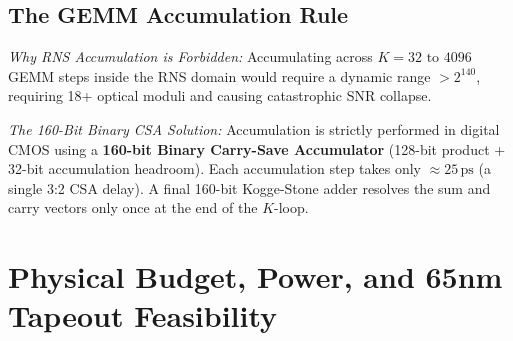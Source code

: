 \documentclass[10pt,journal,compsoc]{IEEEtran}
\begin{document}
\subsection{The GEMM Accumulation Rule}
\textit{Why RNS Accumulation is Forbidden:} Accumulating across $K = 32\text{ to }4096$ GEMM steps inside the RNS domain would require a dynamic range $> 2^{140}$, requiring 18+ optical moduli and causing catastrophic SNR collapse.

\textit{The 160-Bit Binary CSA Solution:} Accumulation is strictly performed in digital CMOS using a \textbf{160-bit Binary Carry-Save Accumulator} (128-bit product + 32-bit accumulation headroom). Each accumulation step takes only \textbf{$\approx 25\,\text{ps}$} (a single 3:2 CSA delay). A final 160-bit Kogge-Stone adder resolves the sum and carry vectors only once at the end of the $K$-loop.

\section{Physical Budget, Power, and 65nm Tapeout Feasibility}\label{sec:budget}

\begin{table}[t]
\caption{3D Monolithic Stack \& 65nm Floorplan Allocation}
\label{tab:area}
\centering
{}
\end{table}
\end{document}
